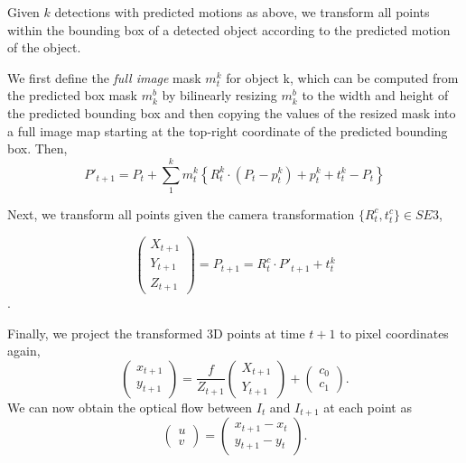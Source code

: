 Given $k$ detections with predicted motions as above, we transform all points within the bounding
box of a detected object according to the predicted motion of the object.

We first define the \emph{full image} mask $m_t^k$ for object k,
which can be computed from the predicted box mask $m_k^b$ by bilinearly resizing
$m_k^b$ to the width and height of the predicted bounding box and then copying the values
of the resized mask into a full image map starting at the top-right coordinate of the predicted bounding box.
Then,
\begin{equation}
P'_{t+1} =
P_t + \sum_1^{k} m_t^k\left\{ R_t^k \cdot (P_t - p_t^k) + p_t^k + t_t^k - P_t \right\}
\end{equation}

Next, we transform all points given the camera transformation $\{R_t^c, t_t^c\} \in SE3$, %

\begin{equation}
\begin{pmatrix}
X_{t+1} \\ Y_{t+1} \\ Z_{t+1}
\end{pmatrix}
= P_{t+1} = R_t^c \cdot P'_{t+1} + t_t^k
\end{equation}.

Finally, we project the transformed 3D points at time $t+1$ to pixel coordinates again,
\begin{equation}
\begin{pmatrix}
x_{t+1} \\ y_{t+1}
\end{pmatrix}
=
\frac{f}{Z_{t+1}}
\begin{pmatrix}
X_{t+1} \\ Y_{t+1}
\end{pmatrix}
+
\begin{pmatrix}
c_0 \\ c_1
\end{pmatrix}.
\end{equation}
We can now obtain the optical flow between $I_t$ and $I_{t+1}$ at each point as
\begin{equation}
\begin{pmatrix}
u \\ v
\end{pmatrix}
=
\begin{pmatrix}
x_{t+1} - x_{t} \\ y_{t+1} - y_{t}
\end{pmatrix}.
\end{equation}


